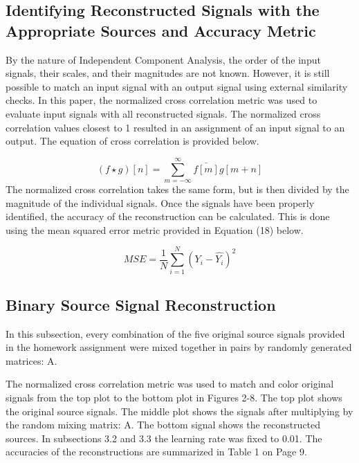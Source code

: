 \documentclass[12pt]{article}
\begin{document}
\subsection{Identifying Reconstructed Signals with the Appropriate Sources and Accuracy Metric}
By the nature of Independent Component Analysis, the order of the input signals, their scales, and their magnitudes are not known. However, it is still possible to match an input signal with an output signal using external similarity checks. In this paper, the normalized cross correlation metric was used to evaluate input signals with all reconstructed signals. The normalized cross correlation values closest to 1 resulted in an assignment of an input signal to an output. The equation of cross correlation is provided below.

\begin{equation}
    (f\star g)[n]=\sum_{m=-\infty}^{\infty} \bar{f[m]}g[m+n]
\end{equation}
\bigbreak
\noindent
The normalized cross correlation takes the same form, but is then divided by the magnitude of the individual signals.
\bigbreak
\noindent
Once the signals have been properly identified, the accuracy of the reconstruction can be calculated. This is done using the mean squared error metric provided in Equation (18) below.

\begin{equation}
    MSE=\frac{1}{N}\sum_{i=1}^{N} (Y_{i}-\hat{Y_{i}})^2
\end{equation}

\subsection{Binary Source Signal Reconstruction}

In this subsection, every combination of the five original source signals provided in the homework assignment were mixed together in pairs by randomly generated matrices: A.

\bigbreak
\noindent
The normalized cross correlation metric was used to match and color original signals from the top plot to the bottom plot in Figures 2-8. The top plot shows the original source signals. The middle plot shows the signals after multiplying by the random mixing matrix: A. The bottom signal shows the reconstructed sources. In subsections 3.2 and 3.3 the learning rate was fixed to 0.01.
\bigbreak
\noindent
The accuracies of the reconstructions are summarized in Table 1 on Page 9.
\end{document}
